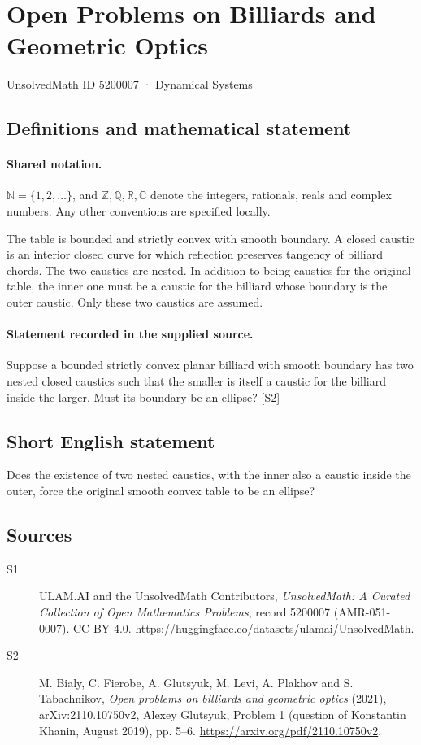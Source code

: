 \documentclass[11pt]{article}
\newcommand{\sref}[2]{\hyperlink{source:#1:#2}{[S#2]}}
\begin{document}
\setcounter{section}{5200006}
\section{Open Problems on Billiards and Geometric Optics}\label{5200007}
{\small\sffamily UnsolvedMath ID 5200007 · Dynamical Systems}
\subsection{Definitions and mathematical statement}

\paragraph{Shared notation.}$\mathbb N=\{1,2,\ldots\}$, and $\mathbb Z,\mathbb Q,\mathbb R,\mathbb C$ denote the integers, rationals, reals and complex numbers. Any other conventions are specified locally.


The table is bounded and strictly convex with smooth boundary. A closed caustic is an interior closed curve for which reflection preserves tangency of billiard chords. The two caustics are nested. In addition to being caustics for the original table, the inner one must be a caustic for the billiard whose boundary is the outer caustic. Only these two caustics are assumed.
\paragraph{Statement recorded in the supplied source.}
Suppose a bounded strictly convex planar billiard with smooth boundary has two nested closed caustics such that the smaller is itself a caustic for the billiard inside the larger. Must its boundary be an ellipse? \sref{5200007}{2}
\subsection{Short English statement}
Does the existence of two nested caustics, with the inner also a caustic inside the outer, force the original smooth convex table to be an ellipse?
\subsection{Sources}
\begin{description}
\item[\hypertarget{source:5200007:1}{S1}] ULAM.AI and the UnsolvedMath Contributors, \emph{UnsolvedMath: A Curated Collection of Open Mathematics Problems}, record 5200007 (AMR-051-0007). CC BY 4.0. \url{https://huggingface.co/datasets/ulamai/UnsolvedMath}.
\item[\hypertarget{source:5200007:2}{S2}] M. Bialy, C. Fierobe, A. Glutsyuk, M. Levi, A. Plakhov and S. Tabachnikov, \emph{Open problems on billiards and geometric optics} (2021), arXiv:2110.10750v2, Alexey Glutsyuk, Problem 1 (question of Konstantin Khanin, August 2019), pp. 5--6. \url{https://arxiv.org/pdf/2110.10750v2}.
\end{description}
\label{end:5200007}
\end{document}
